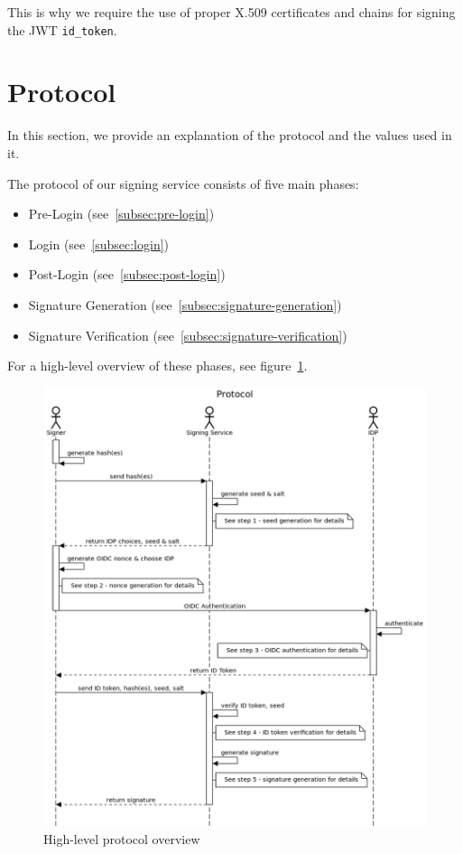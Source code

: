 This is why we require the use of proper X.509 certificates and chains for signing the \gls{JWT} \texttt{id\_token}.





\section{Protocol}\label{sec:protocol}

In this section, we provide an explanation of the protocol and the values used in it.

The protocol of our signing service consists of five main phases:

\begin{itemize}
    \item Pre-Login (see~\ref{subsec:pre-login})
    \item Login (see~\ref{subsec:login})
    \item Post-Login (see~\ref{subsec:post-login})
    \item Signature Generation (see~\ref{subsec:signature-generation})
    \item Signature Verification (see~\ref{subsec:signature-verification})
\end{itemize}

For a high-level overview of these phases, see figure~\ref{fig:highlevelprotocoloverview}.

\begin{figure}
    \begin{center}
        \includegraphics[scale=0.5]{images/protocol_signature_generation_high_level.png}
        \caption{High-level protocol overview}
        \label{fig:highlevelprotocoloverview}
    \end{center}
\end{figure}

